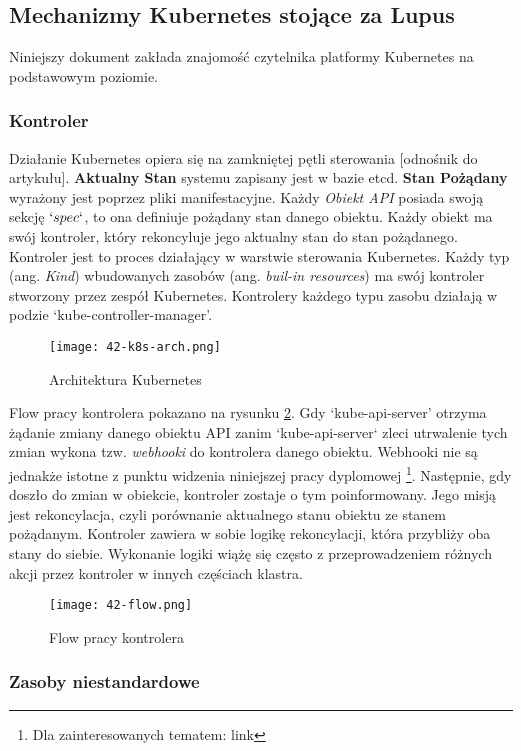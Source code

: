 \subsection{Mechanizmy Kubernetes stojące za Lupus}
Niniejszy dokument zakłada znajomość czytelnika platformy Kubernetes na podstawowym poziomie.

\subsubsection{Kontroler}
Działanie Kubernetes opiera się na zamkniętej pętli sterowania [odnośnik do artykułu]. \textbf{Aktualny Stan} systemu zapisany jest w bazie etcd. \textbf{Stan Pożądany} wyrażony jest poprzez pliki manifestacyjne. Każdy \textit{Obiekt API} posiada swoją sekcję $`spec`$, to ona definiuje pożądany stan danego obiektu. Każdy obiekt ma swój kontroler, który rekoncyluje jego aktualny stan do stan pożądanego. Kontroler jest to proces działający w warstwie sterowania Kubernetes. Każdy typ (ang. \textit{Kind}) wbudowanych zasobów (ang. \textit{buil-in resources}) ma swój kontroler stworzony przez zespół Kubernetes. Kontrolery każdego typu zasobu działają w podzie `kube-controller-manager'. 

\begin{figure}[!h]
    \centering \texttt{[image: 42-k8s-arch.png]}
    \caption{Architektura Kubernetes}\label{fig:42-k8s-arch}
\end{figure}

Flow pracy kontrolera pokazano na rysunku \ref{fig:42-flow}. Gdy `kube-api-server' otrzyma żądanie zmiany danego obiektu API zanim `kube-api-server` zleci utrwalenie tych zmian wykona tzw. \textit{webhooki} do kontrolera danego obiektu. Webhooki nie są jednakże istotne z punktu widzenia niniejszej pracy dyplomowej \footnote{Dla zainteresowanych tematem: link}. Następnie, gdy doszło do zmian w obiekcie, kontroler zostaje o tym poinformowany. Jego misją jest rekoncylacja, czyli porównanie aktualnego stanu obiektu ze stanem pożądanym. Kontroler zawiera w sobie logikę rekoncylacji, która przybliży oba stany do siebie. Wykonanie logiki wiążę się często z przeprowadzeniem różnych akcji przez kontroler w innych częściach klastra. 

\begin{figure}[!h]
    \centering \texttt{[image: 42-flow.png]}
    \caption{Flow pracy kontrolera}\label{fig:42-flow}
\end{figure}

\subsubsection{Zasoby niestandardowe} 

